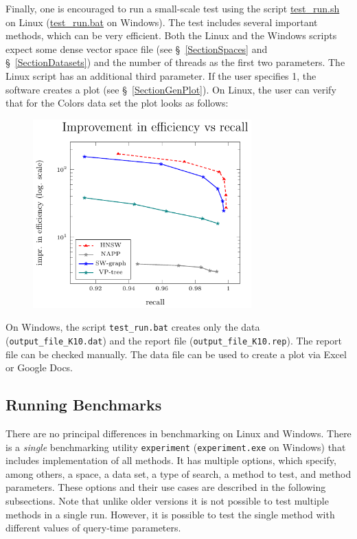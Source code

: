\documentclass[runningheads,a4paper]{llncs}
\newcommand{\replocfile}{https://github.com/searchivarius/nmslib/blob/v1.5/}
\newcommand{\ttt}[1]{\texttt{#1}}
\begin{document}
{Finally, one is encouraged to run a small-scale test using the script
\href{\replocfile scripts/test_run.sh}{test\_run.sh} on Linux (\href{\replocfile scripts/test_run.sh}{test\_run.bat} on Windows).
The test includes several important methods, which can be very efficient.
Both the Linux and the Windows scripts expect some dense vector space file (see \S~\ref{SectionSpaces} and \S~\ref{SectionDatasets}) and the number of threads
as the first two parameters. The Linux script has an additional third parameter. 
If the user specifies 1, the software creates a plot (see \S~\ref{SectionGenPlot}). On Linux, the user can verify
that for the Colors data set \cite{LibMetricSpace} the plot looks as follows:
\begin{figure}[h]
\centering
\includegraphics[width=0.75\textwidth]{figures/test_run.pdf}
\end{figure}

On Windows, the script \ttt{test\_run.bat} creates only the data (\ttt{output\_file\_K\=10.dat}) 
and the report file (\ttt{output\_file\_K\=10.rep}). The report file can be checked manually.
The data file can be used to create a plot via Excel or Google Docs.

\subsection{Running Benchmarks}\label{SectionRunBenchmark}
There are no principal differences in benchmarking on Linux and Windows.
There is a \emph{single} benchmarking utility 
\ttt{experiment} (\ttt{experiment.exe} on Windows) that includes implementation of all methods.
It has multiple options, which specify, among others, 
a space, a data set, a type of search, a method to test, and method parameters.
These options and their use cases are described in the following subsections.
Note that unlike older versions it is not possible to test multiple methods in a single run.
However, it is possible to test the single method with different values of query-time parameters.

}
\end{document}
